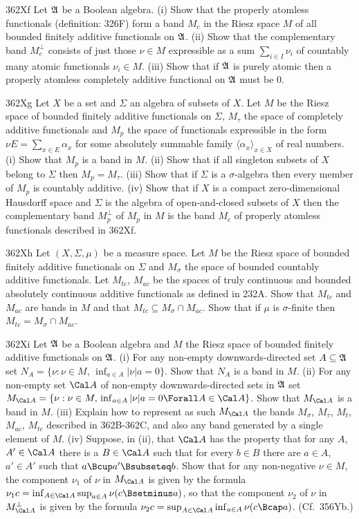 {\spheader 362Xf Let $\frak A$ be a Boolean algebra.   (i) Show that the
properly atomless functionals (definition:  326F) form a band $M_c$
in the Riesz space $M$ of all bounded finitely additive functionals on
$\frak A$.  (ii) Show that the complementary band $M_c^{\perp}$ consists
of just those $\nu\in M$ expressible as a sum $\sum_{i\in I}\nu_i$ of
countably many atomic functionals $\nu_i\in M$.
(iii) Show that if $\frak A$ is purely atomic then a
properly atomless completely additive functional on
$\frak A$ must be $0$.

\spheader 362Xg Let $X$ be a set and $\Sigma$ an algebra of subsets of
$X$.   Let $M$ be the Riesz space of bounded finitely additive
functionals on $\Sigma$, $M_{\tau}$ the space of completely additive
functionals and $M_p$ the space of functionals expressible in the form
$\nu E=\sum_{x\in E}\alpha_x$ for some absolutely summable family
$\langle\alpha_x\rangle_{x\in X}$ of real numbers.   (i) Show that $M_p$
is a band in $M$.    (ii) Show that if all singleton subsets of $X$
belong to $\Sigma$ then $M_p=M_{\tau}$.   (iii) Show that if $\Sigma$ is
a $\sigma$-algebra then every member of $M_p$ is countably additive.
(iv) Show that if $X$ is a compact
zero-dimensional Hausdorff space and $\Sigma$ is the algebra of
open-and-closed subsets of $X$ then the complementary band $M_p^{\perp}$
of $M_p$ in $M$ is the band $M_c$ of
properly atomless functionals described in 362Xf.

\spheader 362Xh Let $(X,\Sigma,\mu)$ be a measure space.   Let $M$ be
the Riesz space of bounded finitely additive functionals on $\Sigma$ and
$M_{\sigma}$ the space of bounded countably additive functionals.
Let $M_{tc}$, $M_{ac}$ be
the spaces of truly continuous and bounded absolutely continuous
additive functionals as defined in 232A.   Show that
$M_{tc}$ and $M_{ac}$ are bands in $M$ and that
$M_{tc}\subseteq M_{\sigma}\cap M_{ac}$.    Show that if $\mu$ is
$\sigma$-finite then $M_{tc}=M_{\sigma}\cap M_{ac}$.

\spheader 362Xi Let $\frak A$ be a Boolean algebra and
$M$ the Riesz space
of bounded finitely additive functionals on $\frak A$.  (i) For any
non-empty downwards-directed set $A\subseteq\frak A$ set
$N_A=\{\nu:\nu\in M,\,\inf_{a\in A}|\nu|a=0\}$.   Show that $N_A$ is a
band in $M$.   (ii) For any non-empty set $\Cal A$ of non-empty
downwards-directed sets in $\frak A$ set
$M_{\Cal A}=\{\nu:\nu\in M,\,\inf_{a\in A}|\nu|a=0\Forall A\in\Cal A\}$.
Show that $M_{\Cal A}$ is a band in $M$.
(iii)  Explain how to represent as such $M_{\Cal A}$ the bands
$M_{\sigma}$, $M_{\tau}$, $M_t$, $M_{ac}$, $M_{tc}$
described in 362B-362C, and also
any band generated by a single element of $M$.
(iv) Suppose, in (ii), that $\Cal A$ has the property
that for any $A$, $A'\in\Cal A$ there is a $B\in\Cal A$ such that for
every $b\in B$ there are $a\in A$, $a'\in A'$ such that $a\Bcup
a'\Bsubseteq b$.   Show that for any non-negative $\nu\in M$, the
component $\nu_1$ of $\nu$ in $M_{\Cal A}$ is given by the formula
$\nu_1c=\inf_{A\in\Cal A}\sup_{a\in A}\nu(c\Bsetminus a)$, so that the
component $\nu_2$ of $\nu$ in $M_{\Cal A}^{\perp}$ is given by the
formula $\nu_2c=\sup_{A\in\Cal A}\inf_{a\in A}\nu(c\Bcap a)$.
(Cf.\ 356Yb.)

}
